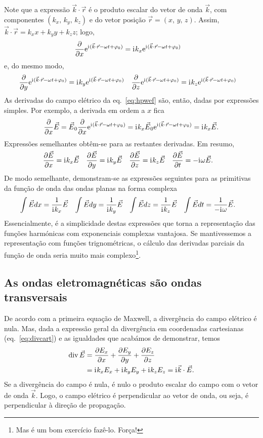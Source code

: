 Note que a expressão $\vec k\cdot\vec r$ é o produto escalar do vetor de onda
$\vec k$, com componentes $(k_x,\,k_y,\,k_z)$ e do vetor posição
$\vec r=(x,\,y,\,z)$. Assim, $\vec k\cdot\vec r=k_xx+k_yy+k_zz$;
logo,
\begin{align*}
  \pd{}{x}\e^{\iu(\vec k\cdot\vec r-\omega t+\varphi_0)}&=
  \iu k_x\e^{\iu(\vec k\cdot\vec r-\omega t+\varphi_0)}
\end{align*}
e, do mesmo modo,
\begin{align*}
  \pd{}{y}\e^{\iu(\vec k\cdot\vec r-\omega t+\varphi_0)}&=
  \iu k_y\e^{\iu(\vec k\cdot\vec r-\omega t+\varphi_0)}&
  \pd{}{z}\e^{\iu(\vec k\cdot\vec r-\omega t+\varphi_0)}&=
  \iu k_z\e^{\iu(\vec k\cdot\vec r-\omega t+\varphi_0)}
\end{align*}
As derivadas do campo elétrico da eq.~\eqref{eq:hpwef} são, então, dadas por
expressões simples. Por exemplo, a derivada em ordem a $x$ fica
\begin{equation*}
  \pd{}{x}\vec E=\vec E_0\pd{}{x}\e^{\iu(\vec k\cdot\vec r-\omega t+\varphi_0)}=
  \iu k_x\vec E_0\e^{\iu(\vec k\cdot\vec r-\omega t+\varphi_0)}=
  \iu k_x \vec E.
\end{equation*}
Expressões semelhantes obtêm-se para as restantes derivadas. Em resumo,
\begin{align*}
  \pd{\vec E}{x}&=\iu k_x\vec E&
  \pd{\vec E}{y}&=\iu k_y\vec E&
  \pd{\vec E}{z}&=\iu k_z\vec E&
  \pd{\vec E}{t}&=-\iu \omega\vec E.
\end{align*}
De modo semelhante, demonstram-se as expressões seguintes para as primitivas da
função de onda das ondas planas na forma complexa
\begin{align*}
\int \vec E dx&=\frac{1}{\iu k_x}\vec E&
\int \vec E dy&=\frac{1}{\iu k_y}\vec E&
\int \vec E dz&=\frac{1}{\iu k_z}\vec E&
\int \vec E dt&=\frac{1}{-\iu \omega}\vec E.
\end{align*}
Essencialmente, é a simplicidade destas expressões que torna a representação das
funções harmónicas com exponenciais complexas vantajosa. Se mantivessemos a
representação com funções trignométricas, o cálculo das derivadas parciais da
função de onda seria muito mais complexo\footnote{Mas é um bom exercício
fazê-lo.  Força!}.

\subsection{As ondas eletromagnéticas são ondas transversais}
De acordo com a primeira equação de Maxwell, a divergência do campo elétrico é
nula. Mas, dada a expressão geral da divergência em coordenadas cartesianas 
(eq.~\eqref{eq:divcart}) e as igualdades que acabámos de demonstrar, temos
\begin{align*}
  \div\vec E&=\pd{E_x}{x}+\pd{E_y}{y}+\pd{E_z}{z}\\
            &=\iu k_x E_x+\iu k_y E_y+\iu k_z E_z=\iu\vec k\cdot\vec E.
\end{align*}
Se a divergência do campo é nula, é nulo o produto escalar do campo com o vetor
de onda $\vec k$. Logo, o campo elétrico é perpendicular ao vetor de onda, ou
seja, é perpendicular à direção de propagação.

